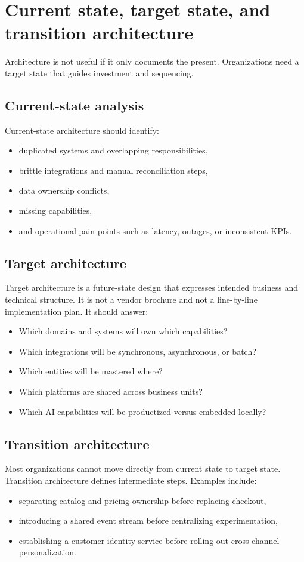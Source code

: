 \section{Current state, target state, and transition architecture}
Architecture is not useful if it only documents the present.
Organizations need a target state that guides investment and sequencing.

\subsection{Current-state analysis}
Current-state architecture should identify:
\begin{itemize}
  \item duplicated systems and overlapping responsibilities,
  \item brittle integrations and manual reconciliation steps,
  \item data ownership conflicts,
  \item missing capabilities,
  \item and operational pain points such as latency, outages, or inconsistent KPIs.
\end{itemize}

\subsection{Target architecture}
Target architecture is a future-state design that expresses intended business and technical structure.
It is not a vendor brochure and not a line-by-line implementation plan.
It should answer:
\begin{itemize}
  \item Which domains and systems will own which capabilities?
  \item Which integrations will be synchronous, asynchronous, or batch?
  \item Which entities will be mastered where?
  \item Which platforms are shared across business units?
  \item Which AI capabilities will be productized versus embedded locally?
\end{itemize}

\subsection{Transition architecture}
Most organizations cannot move directly from current state to target state.
Transition architecture defines intermediate steps.
Examples include:
\begin{itemize}
  \item separating catalog and pricing ownership before replacing checkout,
  \item introducing a shared event stream before centralizing experimentation,
  \item establishing a customer identity service before rolling out cross-channel personalization.
\end{itemize}

